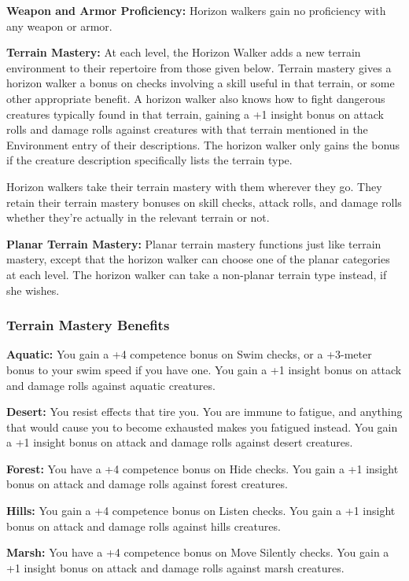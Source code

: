 {
\textbf{Weapon and Armor Proficiency:} Horizon walkers gain no proficiency with any weapon or armor.

\textbf{Terrain Mastery:} At each level, the Horizon Walker adds a new terrain environment to their repertoire from those given below. Terrain mastery gives a horizon walker a bonus on checks involving a skill useful in that terrain, or some other appropriate benefit. A horizon walker also knows how to fight dangerous creatures typically found in that terrain, gaining a +1 insight bonus on attack rolls and damage rolls against creatures with that terrain mentioned in the Environment entry of their descriptions. The horizon walker only gains the bonus if the creature description specifically lists the terrain type.

Horizon walkers take their terrain mastery with them wherever they go. They retain their terrain mastery bonuses on skill checks, attack rolls, and damage rolls whether they're actually in the relevant terrain or not.

\textbf{Planar Terrain Mastery:} Planar terrain mastery functions just like terrain mastery, except that the horizon walker can choose one of the planar categories at each level. The horizon walker can take a non-planar terrain type instead, if she wishes.

\subsubsection{Terrain Mastery Benefits}
\textbf{Aquatic:} You gain a +4 competence bonus on Swim checks, or a +3-meter bonus to your swim speed if you have one. You gain a +1 insight bonus on attack and damage rolls against aquatic creatures.

\textbf{Desert:} You resist effects that tire you. You are immune to fatigue, and anything that would cause you to become exhausted makes you fatigued instead. You gain a +1 insight bonus on attack and damage rolls against desert creatures.

\textbf{Forest:} You have a +4 competence bonus on Hide checks. You gain a +1 insight bonus on attack and damage rolls against forest creatures.

\textbf{Hills:} You gain a +4 competence bonus on Listen checks. You gain a +1 insight bonus on attack and damage rolls against hills creatures.

\textbf{Marsh:} You have a +4 competence bonus on Move Silently checks. You gain a +1 insight bonus on attack and damage rolls against marsh creatures.

}
